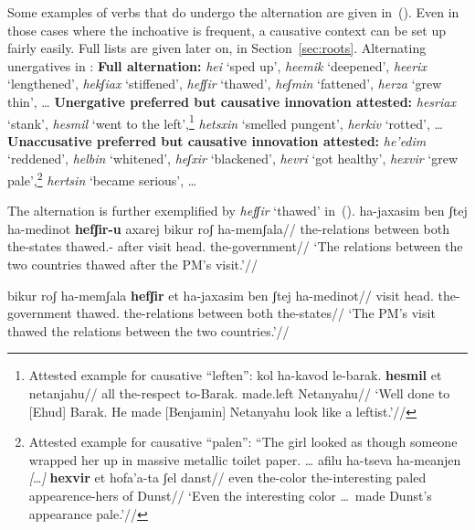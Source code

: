 Some examples of verbs that do undergo the alternation are given in~(\nextx). Even in those cases where the inchoative is frequent, a causative context can be set up fairly easily. Full lists are given later on, in Section~\ref{sec:roots}.
\pex\label{ex:thif-alt}Alternating unergatives in \thif:
	\a \textbf{Full alternation:} \emph{hei{\texttslig}} `sped up', \emph{heemik} `deepened', \emph{heerix} `lengthened', \emph{hekʃiax} `stiffened', \emph{hefʃir} `thawed', \emph{heʃmin} `fattened', \emph{herza} `grew thin', \dots
	\a \textbf{Unergative preferred but causative innovation attested:} \emph{hesriax} `stank', \emph{hesmil} `went to the left',\footnote{Attested example for causative ``leften'':
	\ex
		\begingl
		\gla kol ha-kavod le-barak. \textbf{hesmil} et netanjahu//
		\glb all the-respect to-Barak. made.left  Netanyahu//
		\glft `Well done to [Ehud] Barak. He made [Benjamin] Netanyahu look like a leftist.'//
		\endgl
	\xe
	} \emph{hetsxin} `smelled pungent', \emph{herkiv} `rotted', \dots
	\a \textbf{Unaccusative preferred but causative innovation attested:} \emph{he'edim} `reddened', \emph{helbin} `whitened', \emph{heʃxir} `blackened', \emph{hevri} `got healthy',
		\emph{hexvir} `grew pale',\footnote{Attested example for causative ``palen'':
		\ex ``The girl looked as though someone wrapped her up in massive metallic toilet paper. \dots
			\begingl
			\gla afilu ha-tseva ha-meanjen \emph{[}\dots\emph{]} \textbf{hexvir} et hofa'a-ta ʃel danst//
			\glb even the-color the-interesting {} paled  appearence-hers of Dunst//
			\glft `Even the interesting color \dots~made Dunst's appearance pale.'//
			\endgl
		\xe
		} \emph{hertsin} `became serious', \dots
\xe

The alternation is further exemplified by \emph{hefʃir} `thawed' in~(\nextx).
\pex\label{ex:thif-hefSir}
	\a \begingl
		\gla ha-jaxasim ben ʃtej ha-medinot \textbf{hefʃir-u} axarej bikur roʃ ha-memʃala//
		\glb the-relations between both the-states thawed.- after visit head. the-government//
		\glft `The relations between the two countries thawed after the PM's visit.'//
		\endgl
	
	\a \begingl
		\gla bikur roʃ ha-memʃala \textbf{hefʃir} et ha-jaxasim ben ʃtej ha-medinot//
		\glb visit head. the-government thawed.  the-relations between both the-states//
		\glft `The PM's visit thawed the relations between the two countries.'//
		\endgl
\xe

